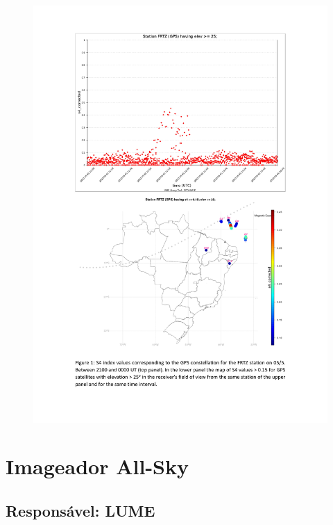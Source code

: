 \documentclass[a4paper, 10pt]{article}
\begin{document}
    \begin{figure}[H]
        \centering
        \includegraphics[width=14cm]{./figures/pt_outfileScint_0.jpg}
    \end{figure} 
 

    \section{Imageador All-Sky} 
 \subsection{Responsável: LUME} 
 
\end{document}
